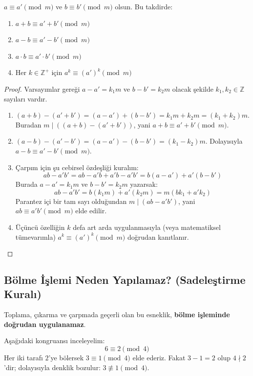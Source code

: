 \begin{theorem}
$a \equiv a' \pmod m$ ve $b \equiv b' \pmod m$ olsun. Bu takdirde:
\begin{enumerate}
    \item $a + b \equiv a' + b' \pmod m$
    \item $a - b \equiv a' - b' \pmod m$
    \item $a \cdot b \equiv a' \cdot b' \pmod m$
    \item Her $k \in \mathbb{Z}^+$ için $a^k \equiv (a')^k \pmod m$
\end{enumerate}
\end{theorem}

\begin{proof}
Varsayımlar gereği $a - a' = k_1 m$ ve $b - b' = k_2 m$ olacak şekilde $k_1, k_2 \in \mathbb{Z}$ sayıları vardır.
\begin{enumerate}
    \item $(a + b) - (a' + b') = (a - a') + (b - b') = k_1 m + k_2 m = (k_1 + k_2)m$. Buradan $m \mid ((a+b)-(a'+b'))$, yani $a + b \equiv a' + b' \pmod m$.
    \item $(a - b) - (a' - b') = (a - a') - (b - b') = (k_1 - k_2)m$. Dolayısıyla $a - b \equiv a' - b' \pmod m$.
    \item Çarpım için şu cebirsel özdeşliği kuralım:
    \[
    a b - a' b' = a b - a' b + a' b - a' b' = b(a - a') + a'(b - b')
    \]
    Burada $a - a' = k_1 m$ ve $b - b' = k_2 m$ yazarsak:
    \[
    a b - a' b' = b(k_1 m) + a'(k_2 m) = m(b k_1 + a' k_2)
    \]
    Parantez içi bir tam sayı olduğundan $m \mid (ab - a'b')$, yani $ab \equiv a'b' \pmod m$ elde edilir.
    \item Üçüncü özelliğin $k$ defa art arda uygulanmasıyla (veya matematiksel tümevarımla) $a^k \equiv (a')^k \pmod m$ doğrudan kanıtlanır.
\end{enumerate}
\end{proof}

\subsection{Bölme İşlemi Neden Yapılamaz? (Sadeleştirme Kuralı)}

Toplama, çıkarma ve çarpmada geçerli olan bu esneklik, \textbf{bölme işleminde doğrudan uygulanamaz}. 

\begin{example}
Aşağıdaki kongruansı inceleyelim:
\[
6 \equiv 2 \pmod 4
\]
Her iki tarafı $2$'ye bölersek $3 \equiv 1 \pmod 4$ elde ederiz. Fakat $3 - 1 = 2$ olup $4 \nmid 2$'dir; dolayısıyla denklik bozulur: $3 \not\equiv 1 \pmod 4$.
\end{example}

